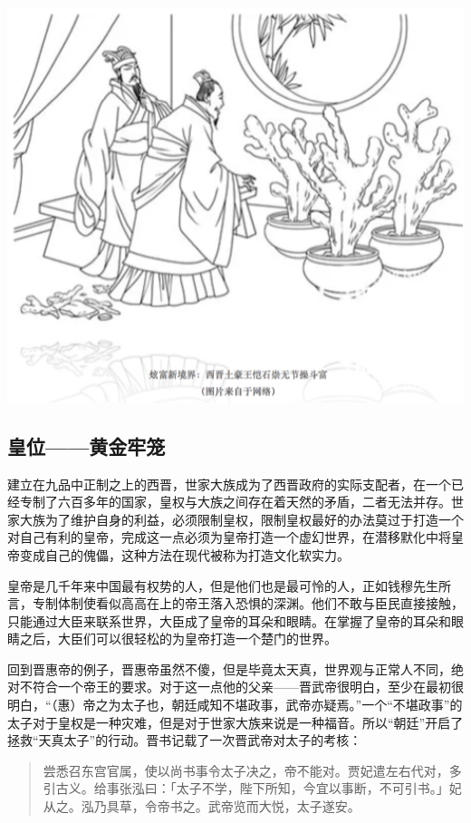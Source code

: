 \documentclass[]{book}
\begin{document}
\includegraphics[width=6.67in]{images/his5}

\subsection{皇位------黄金牢笼}

建立在九品中正制之上的西晋，世家大族成为了西晋政府的实际支配者，在一个已经专制了六百多年的国家，皇权与大族之间存在着天然的矛盾，二者无法并存。世家大族为了维护自身的利益，必须限制皇权，限制皇权最好的办法莫过于打造一个对自己有利的皇帝，完成这一点必须为皇帝打造一个虚幻世界，在潜移默化中将皇帝变成自己的傀儡，这种方法在现代被称为打造文化软实力。

皇帝是几千年来中国最有权势的人，但是他们也是最可怜的人，正如钱穆先生所言，专制体制使看似高高在上的帝王落入恐惧的深渊。他们不敢与臣民直接接触，只能通过大臣来联系世界，大臣成了皇帝的耳朵和眼睛。在掌握了皇帝的耳朵和眼睛之后，大臣们可以很轻松的为皇帝打造一个楚门的世界。

回到晋惠帝的例子，晋惠帝虽然不傻，但是毕竟太天真，世界观与正常人不同，绝对不符合一个帝王的要求。对于这一点他的父亲------晋武帝很明白，至少在最初很明白，``（惠）帝之为太子也，朝廷咸知不堪政事，武帝亦疑焉。''一个``不堪政事''的太子对于皇权是一种灾难，但是对于世家大族来说是一种福音。所以``朝廷''开启了拯救``天真太子''的行动。晋书记载了一次晋武帝对太子的考核：

\begin{quote}
尝悉召东宫官属，使以尚书事令太子决之，帝不能对。贾妃遣左右代对，多引古义。给事张泓曰：「太子不学，陛下所知，今宜以事断，不可引书。」妃从之。泓乃具草，令帝书之。武帝览而大悦，太子遂安。
\end{quote}
\end{document}

